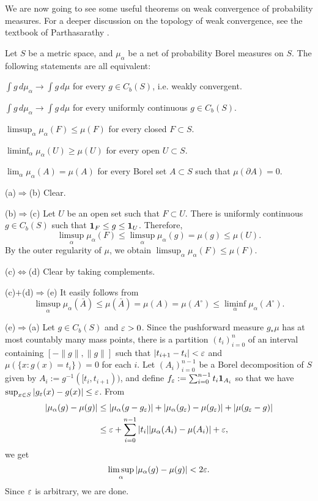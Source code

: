\documentclass{../../small}
\begin{document}
We are now going to see some useful theorems on weak convergence of probability measures.
For a deeper discussion on the topology of weak convergence, see the textbook of Parthasarathy \cite{parthasarathy2005probability}.

\begin{lem}
Let $S$ be a metric space, and $\mu_\alpha$ be a net of probability Borel measures on $S$.
The following statements are all equivalent:
\begin{parts}
\item $\int g\,d\mu_\alpha\to\int g\,d\mu$ for every $g\in C_b(S)$, i.e. weakly convergent.
\item $\int g\,d\mu_\alpha\to\int g\,d\mu$ for every uniformly continuous $g\in C_b(S)$.
\item $\limsup_{\alpha}\mu_\alpha(F)\le\mu(F)$ for every closed $F\subset S$.
\item $\liminf_{\alpha}\mu_\alpha(U)\ge\mu(U)$ for every open $U\subset S$.
\item $\lim_{\alpha}\mu_\alpha(A)=\mu(A)$ for every Borel set $A\subset S$ such that $\mu(\partial A)=0$.
\end{parts}
\end{lem}
\begin{pf}
(a)$\Rightarrow$(b)
Clear.

(b)$\Rightarrow$(c)
Let $U$ be an open set such that $F\subset U$.
There is uniformly continuous $g\in C_b(S)$ such that $\mathbf{1}_F\le g\le\mathbf{1}_U$.
Therefore,
\[\limsup_\alpha\mu_\alpha(F)\le\limsup_\alpha\mu_\alpha(g)=\mu(g)\le\mu(U).\]
By the outer regularity of $\mu$, we obtain $\limsup_\alpha\mu_\alpha(F)\le\mu(F)$.

(c)$\Leftrightarrow$(d)
Clear by taking complements.

(c)$+$(d)$\Rightarrow$(e)
It easily follows from
\[\limsup_\alpha\mu_\alpha(\bar A)\le\mu(\bar A)=\mu(A)=\mu(A^\circ)\le\liminf_\alpha\mu_\alpha(A^\circ).\]

(e)$\Rightarrow$(a)
Let $g\in C_b(S)$ and $\varepsilon>0$.
Since the pushforward measure $g_*\mu$ has at most countably many mass points, there is a partition $(t_i)_{i=0}^n$ of an interval containing $[-\|g\|,\|g\|]$ such that $|t_{i+1}-t_i|<\varepsilon$ and $\mu(\{x:g(x)=t_i\})=0$ for each $i$.
Let $(A_i)_{i=0}^{n-1}$ be a Borel decomposition of $S$ given by $A_i:=g^{-1}([t_i,t_{i+1}))$, and define $f_\varepsilon:=\sum_{i=0}^{n-1}t_i\mathbf{1}_{A_i}$ so that we have $\sup_{x\in S}|g_\varepsilon(x)-g(x)|\le\varepsilon$.
From
\begin{align*}
|\mu_\alpha(g)-\mu(g)|&\le|\mu_\alpha(g-g_\varepsilon)|+|\mu_\alpha(g_\varepsilon)-\mu(g_\varepsilon)|+|\mu(g_\varepsilon-g)|\\
&\le\varepsilon+\sum_{i=0}^{n-1}|t_i||\mu_\alpha(A_i)-\mu(A_i)|+\varepsilon,
\end{align*}
we get
\[\limsup_\alpha|\mu_\alpha(g)-\mu(g)|<2\varepsilon.\]
Since $\varepsilon$ is arbitrary, we are done.
\end{pf}
\end{document}
